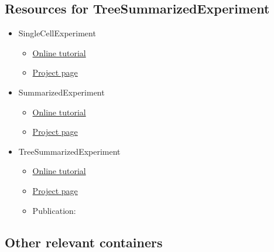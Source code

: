 \documentclass[
]{book}
\providecommand{\tightlist}{%
  \setlength{\itemsep}{0pt}\setlength{\parskip}{0pt}}
\begin{document}
\hypertarget{resources-for-treesummarizedexperiment}{%
\subsection{Resources for TreeSummarizedExperiment}\label{resources-for-treesummarizedexperiment}}

\begin{itemize}
\tightlist
\item
  SingleCellExperiment \citep{R-SingleCellExperiment}

  \begin{itemize}
  \tightlist
  \item
    \href{https://bioconductor.org/packages/release/bioc/vignettes/SingleCellExperiment/inst/doc/intro.html}{Online tutorial}
  \item
    \href{https://bioconductor.org/packages/release/bioc/html/SingleCellExperiment.html}{Project page}
  \end{itemize}
\item
  SummarizedExperiment \citep{R-SummarizedExperiment}

  \begin{itemize}
  \tightlist
  \item
    \href{https://bioconductor.org/packages/release/bioc/vignettes/SummarizedExperiment/inst/doc/SummarizedExperiment.html}{Online tutorial}
  \item
    \href{https://bioconductor.org/packages/release/bioc/html/SummarizedExperiment.html}{Project page}
  \end{itemize}
\item
  TreeSummarizedExperiment \citep{R-TreeSummarizedExperiment}

  \begin{itemize}
  \tightlist
  \item
    \href{https://bioconductor.org/packages/release/bioc/vignettes/TreeSummarizedExperiment/inst/doc/Introduction_to_treeSummarizedExperiment.html}{Online tutorial}
  \item
    \href{https://www.bioconductor.org/packages/release/bioc/html/TreeSummarizedExperiment.html}{Project page}
  \item
    Publication: \citep{Huang2021}
  \end{itemize}
\end{itemize}

\hypertarget{other-relevant-containers}{%
\subsection{Other relevant containers}\label{other-relevant-containers}}
\end{document}
